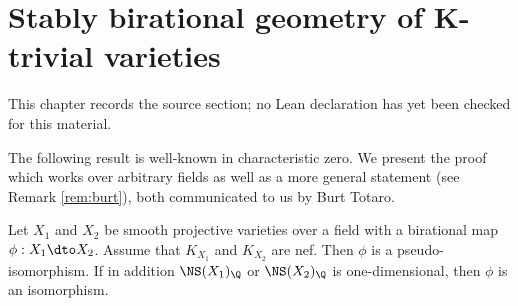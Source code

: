 \chapter{Stably birational geometry of K-trivial varieties}
\label{motivic-invariants-birational-maps-chapter-05}

\begin{remark}
\label{motivic-invariants-birational-maps-chapter-05-source}
This chapter records the source section; no Lean declaration has yet been checked for this material.
\notready
\end{remark}

\label{app:MRC}




The following result is well-known in characteristic zero.
We present the proof
which works over arbitrary fields as well as a more general statement (see Remark \ref{rem:burt}), both
communicated to us by Burt Totaro.

\begin{theorem}[Totaro]
\notready\label{thm:BurtCY}
\label{pic1}
Let $X_1$ and $X_2$ be
smooth projective varieties
over a field with a
birational map
$\phi:X_1 \dto X_2$.
Assume that $K_{X_1}$ and $K_{X_2}$ are nef.
Then $\phi$
is a pseudo-isomorphism.
If in addition
 $\NS(X_1)_\Q$
 or $\NS(X_2)_\Q$
 is one-dimensional, then
$\phi$ is an isomorphism.
\end{theorem}

